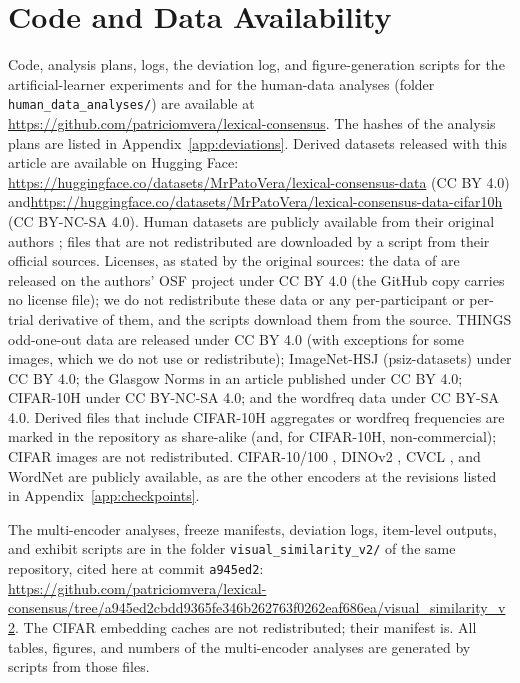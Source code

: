 \documentclass[11pt]{article}
\begin{document}
\section{Code and Data Availability}

Code, analysis plans, logs, the deviation log, and figure-generation scripts for the artificial-learner experiments and for the human-data analyses (folder \texttt{human\_data\_analyses/}) are available at \url{https://github.com/patriciomvera/lexical-consensus}. The hashes of the analysis plans are listed in Appendix~\ref{app:deviations}. Derived datasets released with this article are available on Hugging Face: \url{https://huggingface.co/datasets/MrPatoVera/lexical-consensus-data} (CC BY 4.0) and\newline \url{https://huggingface.co/datasets/MrPatoVera/lexical-consensus-data-cifar10h} (CC BY-NC-SA 4.0). Human datasets are publicly available from their original authors \parencite{lewis2018,hebart2023,roads2021,peterson2019,scott2019}; files that are not redistributed are downloaded by a script from their official sources. Licenses, as stated by the original sources: the data of \textcite{lewis2018} are released on the authors' OSF project under CC BY 4.0 (the GitHub copy carries no license file); we do not redistribute these data or any per-participant or per-trial derivative of them, and the scripts download them from the source. THINGS odd-one-out data are released under CC BY 4.0 (with exceptions for some images, which we do not use or redistribute); ImageNet-HSJ (psiz-datasets) under CC BY 4.0; the Glasgow Norms in an article published under CC BY 4.0; CIFAR-10H under CC BY-NC-SA 4.0; and the wordfreq data under CC BY-SA 4.0. Derived files that include CIFAR-10H aggregates or wordfreq frequencies are marked in the repository as share-alike (and, for CIFAR-10H, non-commercial); CIFAR images are not redistributed. CIFAR-10/100 \parencite{krizhevsky2009}, DINOv2 \parencite{oquab2023}, CVCL \parencite{vong2024}, and WordNet \parencite{miller1995} are publicly available, as are the other encoders at the revisions listed in Appendix~\ref{app:checkpoints}.

The multi-encoder analyses, freeze manifests, deviation logs, item-level outputs, and exhibit scripts are in the folder \texttt{visual\_similarity\_v2/} of the same repository, cited here at commit \texttt{a945ed2}: \url{https://github.com/patriciomvera/lexical-consensus/tree/a945ed2cbdd9365fe346b262763f0262eaf686ea/visual_similarity_v2}. The CIFAR embedding caches are not redistributed; their manifest is. All tables, figures, and numbers of the multi-encoder analyses are generated by scripts from those files.
\end{document}

